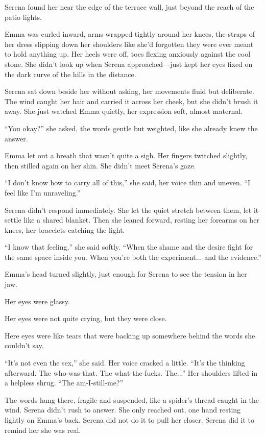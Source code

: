 Serena found her near the edge of the terrace wall, just beyond the reach of the patio lights. 

Emma was curled inward, arms wrapped tightly around her knees, the straps of her dress slipping down her shoulders 
like she’d forgotten they were ever meant to hold anything up. Her heels were off, toes flexing anxiously 
against the cool stone. She didn’t look up when Serena approached—just kept her eyes fixed on the dark 
curve of the hills in the distance.

Serena sat down beside her without asking, her movements fluid but deliberate. The wind caught her hair 
and carried it across her cheek, but she didn’t brush it away. She just watched Emma quietly, her expression 
soft, almost maternal.

``You okay?'' she asked, the words gentle but weighted, like she already knew the answer.

Emma let out a breath that wasn’t quite a sigh. Her fingers twitched slightly, then stilled again on her 
shin. She didn’t meet Serena’s gaze.

``I don’t know how to carry all of this,'' she said, her voice thin and uneven. ``I feel like I’m unraveling.''

Serena didn’t respond immediately. She let the quiet stretch between them, let it settle like a shared 
blanket. Then she leaned forward, resting her forearms on her knees, her bracelets catching the light.

``I know that feeling,'' she said softly. ``When the shame and the desire fight for the same space inside 
you. When you’re both the experiment... and the evidence.''

Emma’s head turned slightly, just enough for Serena to see the tension in her jaw. 

Her eyes were glassy. 

Her eyes were not quite crying, but they were close. 

Here eyes were like tears that were backing up somewhere behind the words she couldn’t 
say. 

``It’s not even the sex,'' she said. Her voice cracked a little. ``It’s the thinking afterward. The 
who-was-that. The what-the-fucks. The...'' Her shoulders lifted in a helpless shrug. ``The am-I-still-me?''

The words hung there, fragile and suspended, like a spider’s thread caught in the wind. Serena didn’t 
rush to answer. She only reached out, one hand resting lightly on Emma’s back. Serena did not do it 
to pull her closer. Serena did it to remind her she was real.

